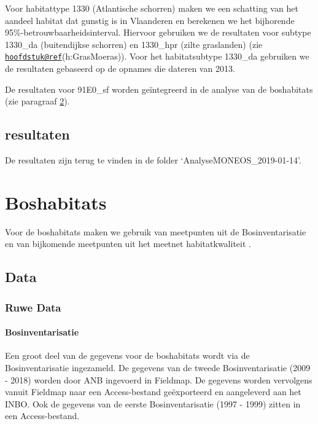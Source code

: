\documentclass[twoside]{extreport}
\begin{document}
Voor habitattype 1330 (Atlantische schorren) maken we een schatting van
het aandeel habitat dat gunstig is in Vlaanderen en berekenen we het
bijhorende 95\%-betrouwbaarheidsinterval. Hiervoor gebruiken we de
resultaten voor subtype 1330\_da (buitendijkse schorren) en 1330\_hpr
(zilte graslanden) (zie
\href{mailto:hoofdstuk@ref}{\nolinkurl{hoofdstuk@ref}}(h:GrasMoeras)).
Voor het habitatsubtype 1330\_da gebruiken we de resultaten gebaseerd op
de opnames die dateren van 2013.

De resultaten voor 91E0\_sf worden geïntegreerd in de analyse van de
boshabitats (zie paragraaf \ref{h:Boshabitats}).

\section{resultaten}\label{resultaten-2}

De resultaten zijn terug te vinden in de folder
`AnalyseMONEOS\_2019-01-14'.

\chapter{Boshabitats}\label{h:Boshabitats}

Voor de boshabitats maken we gebruik van meetpunten uit de
Bosinventarisatie \citep{Wouters2008c} en van bijkomende meetpunten uit
het meetnet habitatkwaliteit \citep{Westra2014}.

\section{Data}\label{data-3}

\subsection{Ruwe Data}\label{ruwe-data-1}

\subsubsection{Bosinventarisatie}\label{bosinventarisatie}

Een groot deel van de gegevens voor de boshabitats wordt via de
Bosinventarisatie ingezameld. De gegevens van de tweede
Bosinventarisatie (2009 - 2018) worden door ANB ingevoerd in Fieldmap.
De gegevens worden vervolgens vanuit Fieldmap naar een Access-bestand
geëxporteerd en aangeleverd aan het INBO. Ook de gegevens van de eerste
Bosinventarisatie (1997 - 1999) zitten in een Access-bestand.
\end{document}
